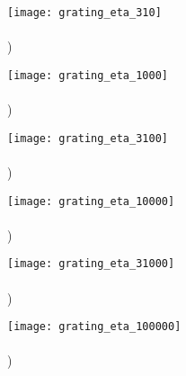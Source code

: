 \documentclass[12pt, letterpaper]{article}
\begin{document}
\begin{figure}[h!]
	\begin{minipage}{0.48\textwidth}
		\texttt{[image: grating\_eta\_310]} \\
		\vspace{-13em} \\ ) \\ \vspace{13em}
	\end{minipage}
	\begin{minipage}{0.48\textwidth}
		\texttt{[image: grating\_eta\_1000]} \\
		\vspace{-13em} \\ ) \\ \vspace{13em}
	\end{minipage}

	\vspace{-3em}
	
	\begin{minipage}{0.48\textwidth}
		\texttt{[image: grating\_eta\_3100]} \\
		\vspace{-13em} \\ ) \\ \vspace{13em}
	\end{minipage}
	\begin{minipage}{0.48\textwidth}
		\texttt{[image: grating\_eta\_10000]} \\
		\vspace{-13em} \\ ) \\ \vspace{13em}
	\end{minipage}
	
	\vspace{-3em}
	
	\begin{minipage}{0.48\textwidth}
		\texttt{[image: grating\_eta\_31000]} \\
		\vspace{-13em} \\ ) \\ \vspace{13em}
	\end{minipage}
	\begin{minipage}{0.48\textwidth}
		\texttt{[image: grating\_eta\_100000]} \\
		\vspace{-13em} \\ ) \\ \vspace{13em}
	\end{minipage}


\end{figure}
\end{document}
